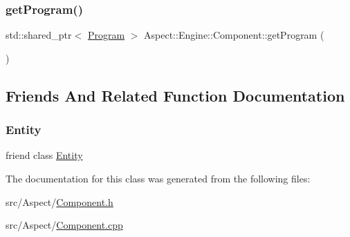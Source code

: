 \subsubsection{\texorpdfstring{get\+Program()}{getProgram()}}
{\footnotesize\ttfamily std\+::shared\+\_\+ptr$<$ \mbox{\hyperlink{class_aspect_1_1_engine_1_1_program}{Program}} $>$ Aspect\+::\+Engine\+::\+Component\+::get\+Program (\begin{DoxyParamCaption}{ }\end{DoxyParamCaption})}



\subsection{Friends And Related Function Documentation}
\mbox{\label{class_aspect_1_1_engine_1_1_component_a614439ccac0344926adc4c0165d64060}} 
\subsubsection{\texorpdfstring{Entity}{Entity}}
{\footnotesize\ttfamily friend class \mbox{\hyperlink{class_aspect_1_1_engine_1_1_entity}{Entity}}\hspace{0.3cm}{\ttfamily [friend]}}



The documentation for this class was generated from the following files\+:\begin{DoxyCompactItemize}
\item 
src/\+Aspect/\mbox{\hyperlink{_component_8h}{Component.\+h}}\item 
src/\+Aspect/\mbox{\hyperlink{_component_8cpp}{Component.\+cpp}}\end{DoxyCompactItemize}
